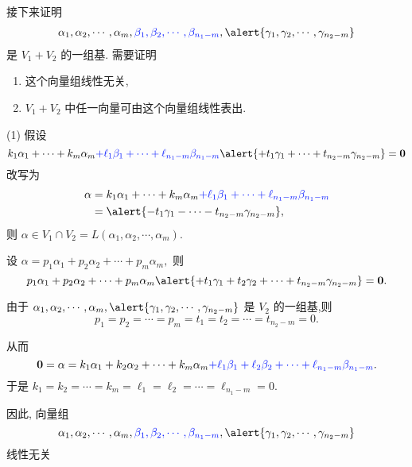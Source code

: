 \documentclass[13pt]{beamer}
\def\0{\mathbf{0}}
\def\a{\alpha}
\newcommand{\blue}{\textcolor{blue}}
\begin{document}
\begin{frame}
接下来证明 
\begin{align*}
\alpha_{1}, \alpha_{2}, \cdots, \alpha_{m}, \blue{\beta_{1}, \beta_{2}, \cdots, \beta_{n_{1}-m}}, \alert{\gamma_{1}, \gamma_{2}, \cdots, \gamma_{n_{2}-m}}
\end{align*} 是 $V_{1}+V_{2}$ 的一组基. 需要证明 
\begin{enumerate}
\item 这个向量组线性无关, 
\item  $V_{1}+V_{2}$ 中任一向量可由这个向量组线性表出.
\end{enumerate} 


(1) 假设 $$k_{1} \alpha_{1}+\cdots+k_{m} \alpha_{m}
\blue{+\ell_{1} \beta_{1}+\cdots+\ell_{n_{1}-m} \beta_{n_{1}-m}}
\alert{+t_{1} \gamma_{1}+\cdots+t_{n_{2}-m} \gamma_{n_{2}-m}}
=\0$$
改写为 
\begin{align*}
\a & = k_{1} \alpha_{1}+\cdots+k_{m} \alpha_{m}
\blue{+\ell_{1} \beta_{1}+\cdots+\ell_{n_{1}-m} \beta_{n_{1}-m}}\\
& = \alert{-t_{1} \gamma_{1}-\cdots-t_{n_{2}-m} \gamma_{n_{2}-m}},
\end{align*}
则 $\alpha \in V_{1} \cap V_{2}=L\left(\alpha_{1}, \alpha_{2}, \cdots, \alpha_{m}\right)$.


\end{frame}

\begin{frame}
设 $\alpha=p_{1} \alpha_{1}+p_{2} \alpha_{2}+\cdots+p_{m} \alpha_{m},$ 则
$$p_{1} \alpha_{1}+p_{2} \alpha_{2}+\cdots+p_{m} \alpha_{m}
\alert{+t_{1} \gamma_{1}+t_{2} \gamma_{2}+\cdots+t_{n_{2}-m} \gamma_{n_{2}-m}}=\0.$$

 由于 $\alpha_{1}, \alpha_{2}, \cdots, \alpha_{m}, 
 \alert{\gamma_{1}, \gamma_{2}, \cdots, \gamma_{n_{2}-m}}$ 是
$V_{2}$ 的一组基,则 $$p_{1}=p_{2}=\cdots=p_{m}=t_{1}=t_{2}=\cdots=t_{n_{2}-m}=0.$$

从而 $$\0=\alpha=k_{1} \alpha_{1}+k_{2} \alpha_{2}+\cdots+k_{m} \alpha_{m}
\blue{+\ell_{1} \beta_{1}+\ell_{2} \beta_{2}+\cdots+\ell_{n_{1}-m} \beta_{n_{1}-m}}.$$ 
于是
$k_{1}=k_{2}=\cdots=k_{m}=\ell_{1}=\ell_{2}=\cdots=\ell_{n_{1}-m}=0 .$ 

因此, 向量组$$\alpha_{1}, \alpha_{2}, \cdots, \alpha_{m}, \blue{\beta_{1}, \beta_{2}, \cdots, \beta_{n_{1}-m}}, \alert{\gamma_{1}, \gamma_{2}, \cdots, \gamma_{n_{2}-m}}$$线性无关
\end{frame}
\end{document}
